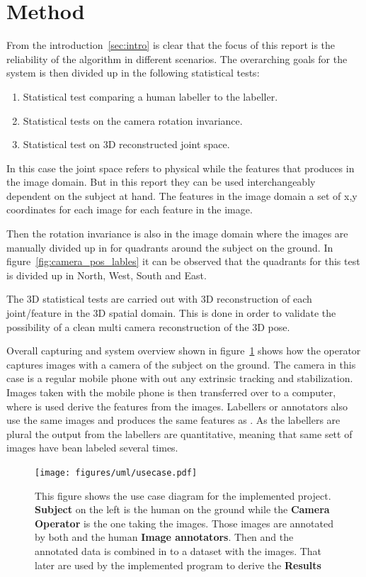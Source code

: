 \section{Method}
\label{sec:method}
From the introduction~\ref{sec:intro} is clear that the focus of this report is the reliability of the \openpose algorithm in different scenarios.
The overarching goals for the system is then divided up in the following statistical tests:
\begin{enumerate}
    \item Statistical test comparing a human labeller to the \openpose labeller.
    \item Statistical tests on the camera rotation invariance.
    \item Statistical test on 3D reconstructed joint space.
\end{enumerate}

In this case the joint space refers to physical while the features that \openpos produces in the image domain.
But in this report they can be used interchangeably dependent on the subject at hand.
The features in the image domain a set of x,y coordinates for each image for each feature in the image.

Then the rotation invariance is also in the image domain where the images are manually divided up in for quadrants around the subject on the ground.
In figure~\ref{fig:camera_pos_lables} it can be observed that the quadrants for this test is divided up in North, West, South and East.

The 3D statistical tests are carried out with 3D reconstruction of each joint/feature in the 3D spatial domain.
This is done in order to validate the possibility of a clean multi camera reconstruction of the 3D pose.

Overall capturing and system overview shown in figure~\ref{fig:usecase} shows how the operator captures images with a camera of the subject on the ground.
The camera in this case is a regular mobile phone with out any extrinsic tracking and stabilization.
Images taken with the mobile phone is then transferred over to a computer, where \openpose is used derive the features from the images.
Labellers or annotators also use the same images and produces the same features as \openpose.
As the labellers are plural the output from the labellers are quantitative, meaning that same sett of images have bean labeled several times.

\begin{figure}
\begin{center}
    \texttt{[image: figures/uml/usecase.pdf]}
\end{center}
\caption{This figure shows the use case diagram for the implemented project. \textbf{Subject} on the left is the human on the ground while the \textbf{Camera Operator} is the one taking the images.
Those images are annotated by both \openpose{ } and the human \textbf{Image annotators}.
Then \openpose{ } and the annotated data is combined in to a dataset with the images.
That later are used by the implemented program to derive the \textbf{Results}}
\label{fig:usecase}
\end{figure}

